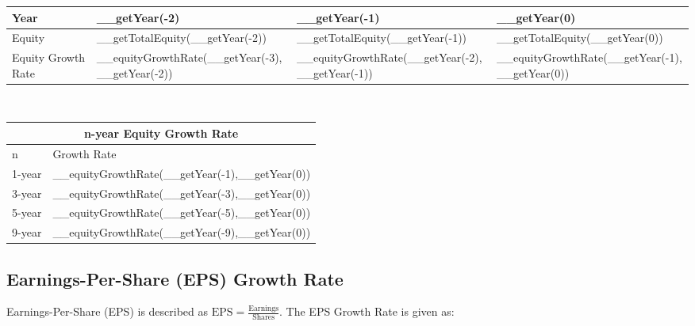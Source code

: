 \begin{tabularx}{\textwidth}{|X|X|X|X|}
 \hline
 Year                                    & __getYear(-2)                                   & __getYear(-1)                                   & __getYear(0)                                   \\
 \hline
 Equity                                  & __getTotalEquity(__getYear(-2))                 & __getTotalEquity(__getYear(-1))                 & __getTotalEquity(__getYear(0))                 \\
 \rowcolor{lightgray} Equity Growth Rate & __equityGrowthRate(__getYear(-3),__getYear(-2)) & __equityGrowthRate(__getYear(-2),__getYear(-1)) & __equityGrowthRate(__getYear(-1),__getYear(0)) \\
 \hline
\end{tabularx}\\

\begin{tabularx}{\textwidth}{|X|X|}
 \hline
 \multicolumn{2}{|c|}{n-year Equity Growth Rate} \\
 \hline
 n & Growth Rate\\
 \hline
 1-year & __equityGrowthRate(__getYear(-1),__getYear(0)) \\
 3-year & __equityGrowthRate(__getYear(-3),__getYear(0)) \\
 5-year & __equityGrowthRate(__getYear(-5),__getYear(0)) \\
 9-year & __equityGrowthRate(__getYear(-9),__getYear(0)) \\
 \hline
\end{tabularx}

\subsection{Earnings-Per-Share (EPS) Growth Rate}

Earnings-Per-Share (EPS) is described as $\text{EPS} = \frac{\text{Earnings}}{\text{Shares}}$.
The EPS Growth Rate is given as:\\

